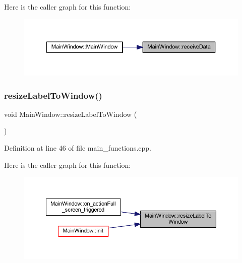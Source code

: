 Here is the caller graph for this function\+:
\nopagebreak
\begin{figure}[H]
\begin{center}
\leavevmode
\includegraphics[width=350pt]{class_main_window_ac7fa2374f28a46ed205758559114d79f_icgraph}
\end{center}
\end{figure}
\mbox{\label{class_main_window_a5e7a591198f61ccccbd9608a519dcd01}} 
\subsubsection{\texorpdfstring{resizeLabelToWindow()}{resizeLabelToWindow()}}
{\footnotesize\ttfamily void Main\+Window\+::resize\+Label\+To\+Window (\begin{DoxyParamCaption}{ }\end{DoxyParamCaption})\hspace{0.3cm}{\ttfamily [private]}}



Definition at line 46 of file main\+\_\+functions.\+cpp.

Here is the caller graph for this function\+:
\nopagebreak
\begin{figure}[H]
\begin{center}
\leavevmode
\includegraphics[width=350pt]{class_main_window_a5e7a591198f61ccccbd9608a519dcd01_icgraph}
\end{center}
\end{figure}
\mbox{\label{class_main_window_abf8d2aa0872c2072510bc93f9f9e4d11}} 
